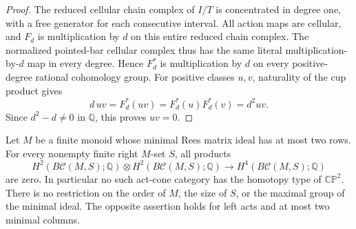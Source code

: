 \begin{proof}
The reduced cellular chain complex of $I/T$ is concentrated in
degree one, with a free generator for each consecutive interval.
All action maps are cellular, and $F_d$ is multiplication by $d$
on this entire reduced chain complex.  The normalized pointed-bar
cellular complex thus has the same literal multiplication-by-$d$
map in every degree.  Hence $F_d^*$ is multiplication by $d$ on
every positive-degree rational cohomology group.  For positive
classes $u,v$, naturality of the cup product gives
\[
 d\,uv=F_d^*(uv)=F_d^*(u)F_d^*(v)=d^2uv.
\]
Since $d^2-d\ne0$ in $\mathbb Q$, this proves $uv=0$.
\end{proof}

\begin{theorem}
\label{C:two-row-act-cups}
Let $M$ be a finite monoid whose minimal Rees matrix ideal has at
most two rows.  For every nonempty finite right $M$-set $S$, all
products
\[
 H^2(B\mathcal C(M,S);\mathbb Q)\otimes
 H^2(B\mathcal C(M,S);\mathbb Q)
 \longrightarrow H^4(B\mathcal C(M,S);\mathbb Q)
\]
are zero.  In particular no such act-cone category has the homotopy
type of $\mathbb{CP}^2$.  There is no restriction on the order of
$M$, the size of $S$, or the maximal group of the minimal ideal.
The opposite assertion holds for left acts and at most two minimal
columns.
\end{theorem}
